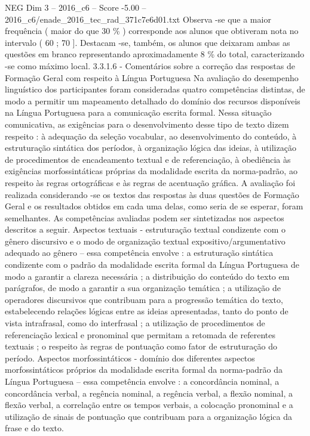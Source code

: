 \begin{textsample}{NEG Dim 3 – 2016\_c6 – Score -5.00 – 2016\_c6/enade\_2016\_tec\_rad\_371c7e6d01.txt}
Observa -se que a maior frequência ( maior do que 30 \% ) corresponde aos alunos que obtiveram nota no intervalo ( 60 ; 70 ].
Destacam -se, também, os alunos que deixaram ambas as questões em branco representando aproximadamente 8 \% do total, caracterizando -se como máximo local. 3.3.1.6 - Comentários sobre a correção das respostas de Formação Geral com respeito à Língua Portuguesa Na avaliação do desempenho linguístico dos participantes foram consideradas quatro competências distintas, de modo a permitir um mapeamento detalhado do domínio dos recursos disponíveis na Língua Portuguesa para a comunicação escrita formal.
Nessa situação comunicativa, as exigências para o desenvolvimento desse tipo de texto dizem respeito : à adequação da seleção vocabular, ao desenvolvimento do conteúdo, à estruturação sintática dos períodos, à organização lógica das ideias, à utilização de procedimentos de encadeamento textual e de referenciação, à obediência às exigências morfossintáticas próprias da modalidade escrita da norma-padrão, ao respeito às regras ortográficas e às regras de acentuação gráfica.
A avaliação foi realizada considerando -se os textos das respostas às duas questões de Formação Geral e os resultados obtidos em cada uma delas, como seria de se esperar, foram semelhantes.
As competências avaliadas podem ser sintetizadas nos aspectos descritos a seguir.
Aspectos textuais - estruturação textual condizente com o gênero discursivo e o modo de organização textual expositivo/argumentativo adequado ao gênero – essa competência envolve : a estruturação sintática condizente com o padrão da modalidade escrita formal da Língua Portuguesa de modo a garantir a clareza necessária ; a distribuição do conteúdo do texto em parágrafos, de modo a garantir a sua organização temática ; a utilização de operadores discursivos que contribuam para a progressão temática do texto, estabelecendo relações lógicas entre as ideias apresentadas, tanto do ponto de vista intrafrasal, como do interfrasal ; a utilização de procedimentos de referenciação lexical e pronominal que permitam a retomada de referentes textuais ; o respeito às regras de pontuação como fator de estruturação do período.
Aspectos morfossintáticos - domínio dos diferentes aspectos morfossintáticos próprios da modalidade escrita formal da norma-padrão da Língua Portuguesa – essa competência envolve : a concordância nominal, a concordância verbal, a regência nominal, a regência verbal, a flexão nominal, a flexão verbal, a correlação entre os tempos verbais, a colocação pronominal e a utilização de sinais de pontuação que contribuam para a organização lógica da frase e do texto.

\end{textsample}
